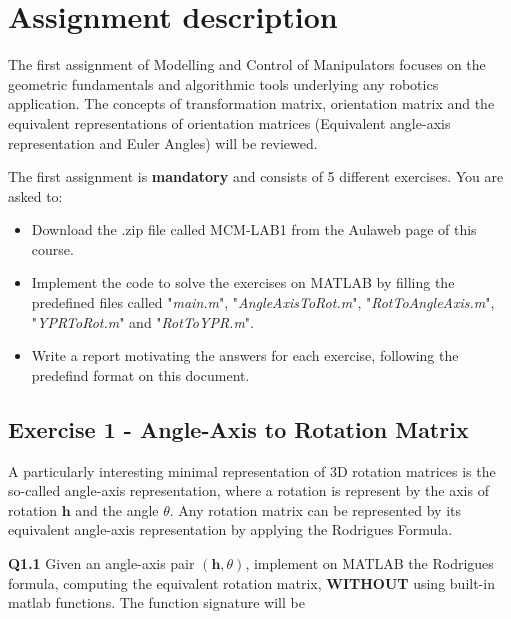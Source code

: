 \section{Assignment description}
The first assignment of Modelling and Control of Manipulators focuses on the geometric fundamentals and algorithmic tools underlying any robotics application. The concepts of transformation matrix, orientation matrix and the equivalent representations of orientation matrices (Equivalent angle-axis representation and Euler Angles) will be reviewed.

The first assignment is \textbf{mandatory} and consists of 5 different exercises. You are asked to:
\begin{itemize}
    \item Download the .zip file called MCM-LAB1 from the Aulaweb page of this course.
    \item Implement the code to solve the exercises on MATLAB by filling the predefined files called "\textit{main.m}", "\textit{AngleAxisToRot.m}", "\textit{RotToAngleAxis.m}", "\textit{YPRToRot.m}" and "\textit{RotToYPR.m}".
    \item Write a report motivating the answers for each exercise, following the predefind format on this document.
\end{itemize}

\subsection{Exercise 1 - Angle-Axis to Rotation Matrix}
A particularly interesting minimal representation of 3D rotation matrices is the so-called angle-axis representation, where a rotation is represent by the axis of rotation \begin{math}\textbf{h}\end{math} and the angle $\theta$. Any rotation matrix can be represented by its equivalent angle-axis representation by applying the Rodrigues Formula.



\textbf{Q1.1} Given an angle-axis pair \begin{math}(\textbf{h},\theta)\end{math}, implement on MATLAB the Rodrigues formula, computing the equivalent rotation matrix, \textbf{WITHOUT} using built-in matlab functions. The function signature will be


